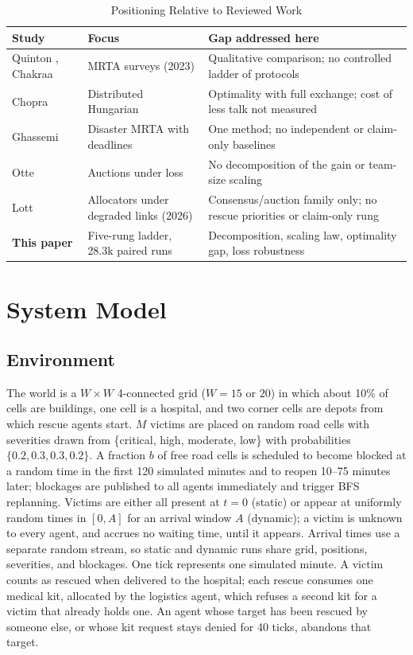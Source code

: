 \documentclass[conference]{IEEEtran}
\begin{document}
\begin{table}[!t]
\caption{Positioning Relative to Reviewed Work}
\label{tab:position}
\centering
\footnotesize
\setlength{\tabcolsep}{3pt}
\begin{tabular}{@{}p{1.55cm}p{2.25cm}p{3.95cm}@{}}
\toprule
\textbf{Study} & \textbf{Focus} & \textbf{Gap addressed here} \\
\midrule
Quinton \cite{quinton2023}, Chakraa \cite{chakraa2023} & MRTA surveys (2023) & Qualitative comparison; no controlled ladder of protocols \\
Chopra \cite{chopra2017} & Distributed Hungarian & Optimality with full exchange; cost of less talk not measured \\
Ghassemi \cite{ghassemi2022} & Disaster MRTA with deadlines & One method; no independent or claim-only baselines \\
Otte \cite{otte2020} & Auctions under loss & No decomposition of the gain or team-size scaling \\
Lott \cite{lott2026} & Allocators under degraded links (2026) & Consensus/auction family only; no rescue priorities or claim-only rung \\
\textbf{This paper} & Five-rung ladder, 28.3k paired runs & Decomposition, scaling law, optimality gap, loss robustness \\
\bottomrule
\end{tabular}
\end{table}

\section{System Model}
\subsection{Environment}
The world is a $W\times W$ 4-connected grid ($W=15$ or $20$) in which about 10\% of cells are buildings, one cell is a hospital, and two corner cells are depots from which rescue agents start. $M$ victims are placed on random road cells with severities drawn from \{critical, high, moderate, low\} with probabilities $\{0.2,0.3,0.3,0.2\}$. A fraction $b$ of free road cells is scheduled to become blocked at a random time in the first 120 simulated minutes and to reopen 10--75 minutes later; blockages are published to all agents immediately and trigger BFS replanning. Victims are either all present at $t=0$ (static) or appear at uniformly random times in $[0,A]$ for an arrival window $A$ (dynamic); a victim is unknown to every agent, and accrues no waiting time, until it appears. Arrival times use a separate random stream, so static and dynamic runs share grid, positions, severities, and blockages. One tick represents one simulated minute. A victim counts as rescued when delivered to the hospital; each rescue consumes one medical kit, allocated by the logistics agent, which refuses a second kit for a victim that already holds one. An agent whose target has been rescued by someone else, or whose kit request stays denied for 40 ticks, abandons that target.
\end{document}
